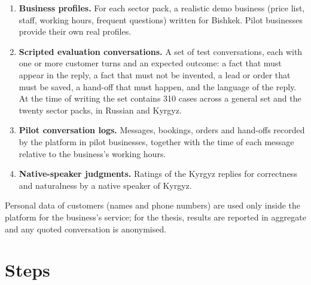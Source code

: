 \begin{enumerate}
	\item \textbf{Business profiles.} For each sector pack, a realistic demo business (price list, staff, working hours,
	frequent questions) written for Bishkek. Pilot businesses provide their own real profiles.
	\item \textbf{Scripted evaluation conversations.} A set of test conversations, each with one or more customer turns
	and an expected outcome: a fact that must appear in the reply, a fact that must not be invented, a lead or order that
	must be saved, a hand-off that must happen, and the language of the reply. At the time of writing the set contains 310
	cases across a general set and the twenty sector packs, in Russian and Kyrgyz.
	\item \textbf{Pilot conversation logs.} Messages, bookings, orders and hand-offs recorded by the platform in pilot
	businesses, together with the time of each message relative to the business's working hours.
	\item \textbf{Native-speaker judgments.} Ratings of the Kyrgyz replies for correctness and naturalness by a native
	speaker of Kyrgyz.
\end{enumerate}

Personal data of customers (names and phone numbers) are used only inside the platform for the business's service; for
the thesis, results are reported in aggregate and any quoted conversation is anonymised.

\section{Steps}

